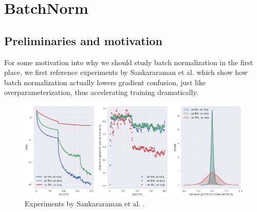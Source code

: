 \documentclass{article}
\begin{document}
\pagebreak
\section{BatchNorm}
\label{label:BatchNorm}

\subsection{Preliminaries and motivation}
For some motivation into why we should study batch normalization in the first place, we first reference experiments by Sankararaman et al. \cite{gradient_confusion} which show how batch normalization actually lowers gradient confusion, just like overparameterization, thus accelerating training dramatically.

\begin{figure}[h]
	\centering
    \includegraphics[width=\textwidth]{pics/batchNorm/batchnorm_grad_conf.png}
	\caption{Experiments by Sankararaman et al. \cite{gradient_confusion}. }
	\label{fig:batchnorm}
\end{figure}
\end{document}
